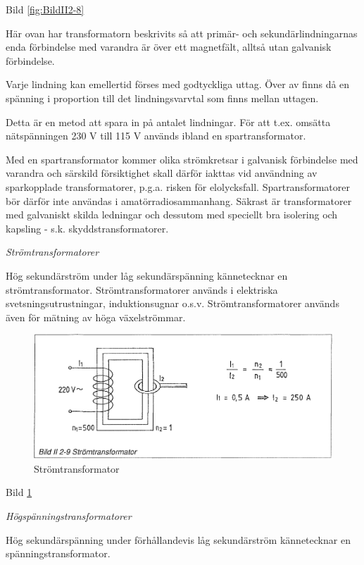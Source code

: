 Bild \ref{fig:BildII2-8}

Här ovan har transformatorn beskrivits så att primär- och sekundärlindningarnas
enda förbindelse med varandra är över ett magnetfält, alltså utan galvanisk
förbindelse.

Varje lindning kan emellertid förses med godtyckliga uttag. Över av finns då en
spänning i proportion till det lindningsvarvtal som finns mellan uttagen.

Detta är en metod att spara in på antalet lindningar. För att t.ex. omsätta
nätspänningen 230 V till 115 V används ibland en spartransformator.

Med en spartransformator kommer olika strömkretsar i galvanisk förbindelse med
varandra och särskild försiktighet skall därför iakttas vid användning av
sparkopplade transformatorer, p.g.a. risken för elolycksfall.
Spartransformatorer bör därför inte användas i amatörradiosammanhang. Säkrast
är transformatorer med galvaniskt skilda ledningar och dessutom med speciellt
bra isolering och kapsling - s.k. skyddstransformatorer.

\emph{Strömtransformatorer}

Hög sekundärström under låg sekundärspänning kännetecknar en strömtransformator.
Strömtransformatorer används i elektriska svetsningsutrustningar,
induktionsugnar o.s.v. Strömtransformatorer används även för mätning av höga
växelströmmar.

\begin{figure}[h]
\begin{center}
\includegraphics[width=\textwidth]{images/bild_2_2-09}
\caption{Strömtransformator}
\label{fig:BildII2-9}
\end{center}
\end{figure}

Bild \ref{fig:BildII2-9}

\emph{Högspänningstransformatorer}

Hög sekundärspänning under förhållandevis låg sekundärström kännetecknar en
spänningstransformator.

